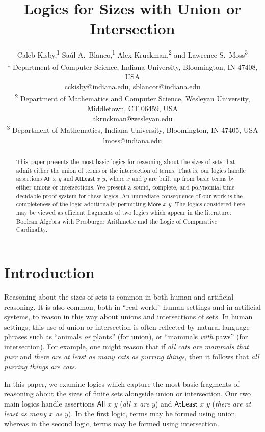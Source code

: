 \documentclass[letterpaper]{article} %
\title{Logics for Sizes with Union or Intersection}
\author{Caleb Kisby,\textsuperscript{\rm 1} 
Sa\'ul A.~Blanco,\textsuperscript{\rm 1} 
Alex Kruckman,\textsuperscript{\rm 2} and 
Lawrence S.~Moss\textsuperscript{\rm 3}\\ 
\textsuperscript{1}
Department of Computer Science, Indiana University, Bloomington, IN 47408, USA \\
cckisby@indiana.edu, sblancor@indiana.edu \\
\textsuperscript{2}
Department of Mathematics and Computer Science, Wesleyan University, Middletown, CT 06459,  USA\\
akruckman@wesleyan.edu \\
\textsuperscript{3}
Department of Mathematics, Indiana University, Bloomington, IN 47405, USA \\
lmoss@indiana.edu \\
}
\theoremstyle{definition}
\newcommand{\All}[2]{\mathsf{All}\,\,#1\,\,#2}
\newcommand{\Atleast}[2]{\mathsf{AtLeast}\,\,#1\,\,#2}
\newcommand{\More}[2]{\mathsf{More}\,\,#1\,\,#2}
\begin{document}
\maketitle


\begin{abstract}
    This paper presents the most basic logics for reasoning about the sizes of sets that admit either the union of terms or the intersection of terms.  That is, our logics handle assertions $\All{x}{y}$ and $\Atleast{x}{y}$, where $x$ and $y$ are built up from basic terms by either unions or intersections.  We present a sound, complete, and polynomial-time decidable proof system for these logics. 
    An immediate consequence of our work is the completeness of the logic additionally permitting $\More{x}{y}$.  The logics considered here may be viewed as efficient fragments of two logics which appear in the literature:  Boolean Algebra with Presburger Arithmetic and the Logic of Comparative Cardinality.
\end{abstract}

\section{Introduction}

Reasoning about the sizes of sets is common in both human and artificial reasoning.  It is also common, both in ``real-world'' human settings and in artificial systems, to reason in this way about unions and intersections of sets. In human settings, this use of union or intersection is often reflected by natural language phrases such as ``animals \emph{or} plants'' (for union), or ``mammals \emph{with} paws'' (for intersection).  For example, one might reason that if \emph{all cats are mammals that purr} and \emph{there are at least as many cats as purring things}, then it follows that \emph{all purring things are cats}.

In this paper, we examine logics which capture the most basic fragments of reasoning about the sizes of finite sets alongside union or intersection.  Our two main logics handle assertions $\All{x}{y}$ (\emph{all $x$ are $y$}) and $\Atleast{x}{y}$ (\emph{there are at least as many $x$ as $y$}).  In the first logic, terms may be formed using union, whereas in the second logic, terms may be formed using intersection.
\end{document}
